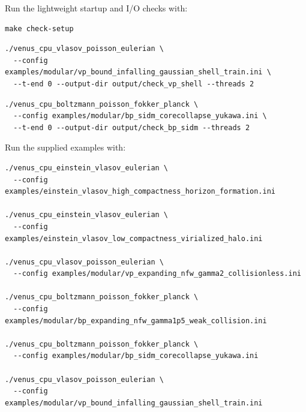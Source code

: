 Run the lightweight startup and I/O checks with:
\begin{lstlisting}
make check-setup
\end{lstlisting}
\ifvenusfullcpu
{}
\begin{lstlisting}
./venus_cpu_vlasov_poisson_eulerian \
  --config examples/modular/vp_bound_infalling_gaussian_shell_train.ini \
  --t-end 0 --output-dir output/check_vp_shell --threads 2
\end{lstlisting}
\else
{}
\begin{lstlisting}
./venus_cpu_boltzmann_poisson_fokker_planck \
  --config examples/modular/bp_sidm_corecollapse_yukawa.ini \
  --t-end 0 --output-dir output/check_bp_sidm --threads 2
\end{lstlisting}
\fi

\ifvenusfullcpu
Run the supplied examples with:
\begin{lstlisting}
./venus_cpu_einstein_vlasov_eulerian \
  --config examples/einstein_vlasov_high_compactness_horizon_formation.ini

./venus_cpu_einstein_vlasov_eulerian \
  --config examples/einstein_vlasov_low_compactness_virialized_halo.ini

./venus_cpu_vlasov_poisson_eulerian \
  --config examples/modular/vp_expanding_nfw_gamma2_collisionless.ini

./venus_cpu_boltzmann_poisson_fokker_planck \
  --config examples/modular/bp_expanding_nfw_gamma1p5_weak_collision.ini

./venus_cpu_boltzmann_poisson_fokker_planck \
  --config examples/modular/bp_sidm_corecollapse_yukawa.ini

./venus_cpu_vlasov_poisson_eulerian \
  --config examples/modular/vp_bound_infalling_gaussian_shell_train.ini
\end{lstlisting}

